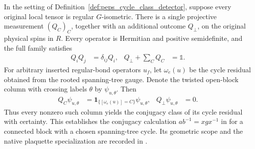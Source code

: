 \begin{lemma}%
    \label{thm:peps_cycle_class_physical_measurement}
    \leanok
    In the setting of Definition~\ref{def:peps_cycle_class_detector},
    suppose every original local tensor is regular $G$-isometric.
    There is a single projective measurement $(Q_C)_C$, together with an
    additional outcome $Q_\perp$, on the original physical spins in $R$.
    Every operator is Hermitian and positive semidefinite, and the full
    family satisfies
    \begin{align}
        Q_iQ_j             & =\delta_{ij}Q_i, &
        Q_\perp+\sum_C Q_C & =\mathbb 1.
        \label{eq:peps_cycle_class_measurement}
    \end{align}
    For arbitrary inserted regular-bond operators $u_f$, let $\omega_e(u)$
    be the cycle residual obtained from the rooted spanning-tree gauge.
    Denote the twisted open-block column with crossing labels
    $\theta$ by $\psi_{u,\theta}$. Then
    \begin{align}
        Q_C\psi_{u,\theta}
                               & =\mathbf1_{\{[\omega_e(u)]=C\}}\psi_{u,\theta}, &
        Q_\perp\psi_{u,\theta} & =0.
        \label{eq:peps_cycle_class_certainty}
    \end{align}
    Thus every nonzero such column yields the conjugacy class of its
    cycle residual with certainty. This establishes the conjugacy
    calculation $ab^{-1}=xgx^{-1}$ in
    \cite[proof of Theorem~6.15]{Schuch2010PEPS} for a connected block
    with a chosen spanning-tree cycle. Its geometric scope and the native plaquette specialization are recorded in
    \cite{gap:rmp_peps_quantum_double_g_isometry}.
\end{lemma}
